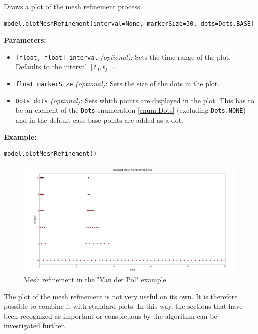 \documentclass[12pt]{article}
\begin{document}
\begin{mdframed}[backgroundcolor=gray!10, roundcorner=10pt,
		linewidth=1pt]
	
	Draws a plot of the mesh refinement process.
 
	\begin{lstlisting}
model.plotMeshRefinement(interval=None, markerSize=30, dots=Dots.BASE)
		\end{lstlisting}
	\label{plotMeshRefinement}
	\textbf{Parameters:}
	\begin{itemize}
		\item \texttt{[float, float] interval} \emph{(optional)}: Sets the time range of the plot. Defaults to the interval $[t_0, t_f]$.
		
		\item \texttt{float markerSize} \emph{(optional)}: Sets the size of the dots in the plot.
		
		\item \texttt{Dots dots} \emph{(optional)}: Sets which points are displayed in the plot. This has to be an element of the \texttt{Dots} enumeration \eqref{enum:Dots} (excluding \texttt{Dots.NONE}) and in the default case base points are added as a dot.
	\end{itemize}
	
	\textbf{Example:}
\begin{lstlisting}
model.plotMeshRefinement()
\end{lstlisting}
\begin{figure}[H]
	\centering
	\includegraphics[width=1\textwidth]{images/refinementVDP.png}
	\caption{Mesh refinement in the "Van der Pol" example}
	\label{fig:vdp}
\end{figure}
\end{mdframed}

The plot of the mesh refinement is not very useful on its own. It is therefore possible to combine it with standard plots. In this way, the sections that have been recognized as important or conspicuous by the  algorithm can be investigated further.
\end{document}
